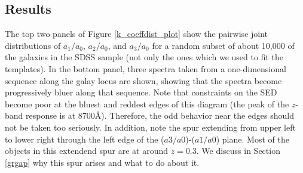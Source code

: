 \documentclass[10pt,preprint]{aastex}
\begin{document}


\subsection{Results}

The top two panels of Figure \ref{k_coeffdist_plot} show the pairwise
joint distributions of $a_1/a_0$, $a_2/a_0$, and $a_3/a_0$ for a
random subset of about 10,000 of the galaxies in the SDSS sample (not
only the ones which we used to fit the templates). In the bottom
panel, three spectra taken from a one-dimensional sequence along the
galay locus are shown, showing that the spectra become progressively
bluer along that sequence. Note that constraints on the SED become
poor at the bluest and reddest edges of this diagram (the peak of the
$z$-band response is at 8700\AA). Therefore, the odd behavior near the
edges should not be taken too seriously. In addition, note the spur
extending from upper left to lower right through the left edge of the
($a3/a0$)-($a1/a0$) plane. Most of the objects in this extendend spur
are at around $z=0.3$. We discuss in Section \ref{grgap} why this spur
arises and what to do about it. 
\end{document}

